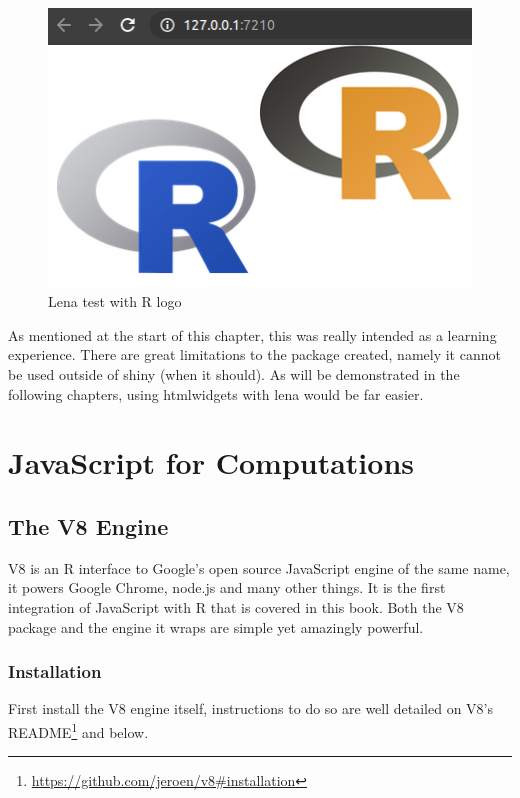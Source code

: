 \documentclass[
]{krantz}
\renewcommand{\href}[2]{#2\footnote{\url{#1}}}
\begin{document}
\begin{figure}
\centering
\includegraphics{images/lena-test.png}
\caption{Lena test with R logo}
\end{figure}

As mentioned at the start of this chapter, this was really intended as a learning experience. There are great limitations to the package created, namely it cannot be used outside of shiny (when it should). As will be demonstrated in the following chapters, using htmlwidgets with lena would be far easier.

\hypertarget{part-javascript-for-computations}{%
\part{JavaScript for Computations}\label{part-javascript-for-computations}}

\hypertarget{the-v8-engine}{%
\chapter{The V8 Engine}\label{the-v8-engine}}

V8 is an R interface to Google's open source JavaScript engine of the same name, it powers Google Chrome, node.js and many other things. It is the first integration of JavaScript with R that is covered in this book. Both the V8 package and the engine it wraps are simple yet amazingly powerful.

\hypertarget{installation}{%
\section{Installation}\label{installation}}

First install the V8 engine itself, instructions to do so are well detailed on \href{https://github.com/jeroen/v8\#installation}{V8's README} and below.
\end{document}
